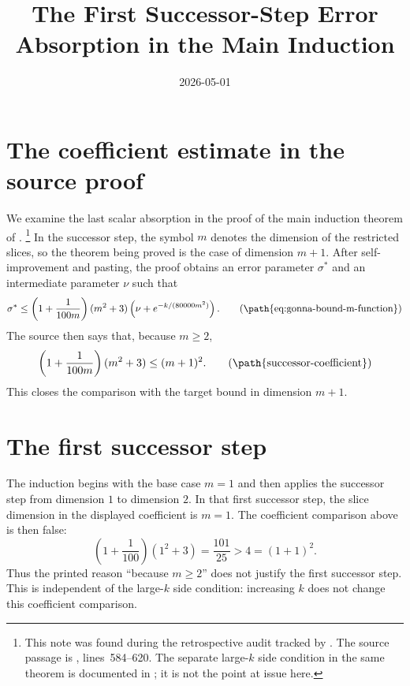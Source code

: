 \documentclass[11pt]{article}
\title{The First Successor-Step Error Absorption in the Main Induction}
\author{}
\date{2026-05-01}
\begin{document}
\maketitle

\section{The coefficient estimate in the source proof}

We examine the last scalar absorption in the proof of the main induction theorem
of \cite[Section~\emph{The main induction step}]{Ji2020LowIndividualDegree}.%
\footnote{This note was found during the retrospective audit tracked by
. The source passage is
, lines~584--620. The separate
large-$k$ side condition in the same theorem is documented in
; it is not the point at
issue here.}
In the successor step, the symbol $m$ denotes the dimension of the restricted
slices, so the theorem being proved is the case of dimension $m+1$. After
self-improvement and pasting, the proof obtains an error parameter $\sigma^*$ and
an intermediate parameter $\nu$ such that
\begin{equation*}
  \sigma^*
  \le
  \left(1+\frac{1}{100m}\right)(m^2+3)
  \left(\nu+e^{-k/(80000m^2)}\right).
  \tag{\path{eq:gonna-bound-m-function}}
\end{equation*}
The source then says that, because $m\ge 2$,
\begin{equation*}
  \left(1+\frac{1}{100m}\right)(m^2+3) \le (m+1)^2.
  \tag{\path{successor-coefficient}}
\end{equation*}
This closes the comparison with the target bound in dimension $m+1$.

\section{The first successor step}

The induction begins with the base case $m=1$ and then applies the successor
step from dimension $1$ to dimension $2$. In that first successor step, the
slice dimension in the displayed coefficient is $m=1$. The coefficient
comparison above is then false:
\[
  \left(1+\frac{1}{100}\right)(1^2+3)
  = \frac{101}{25}
  > 4
  = (1+1)^2.
\]
Thus the printed reason ``because $m\ge 2$'' does not justify the first
successor step. This is independent of the large-$k$ side condition: increasing
$k$ does not change this coefficient comparison.
\end{document}
